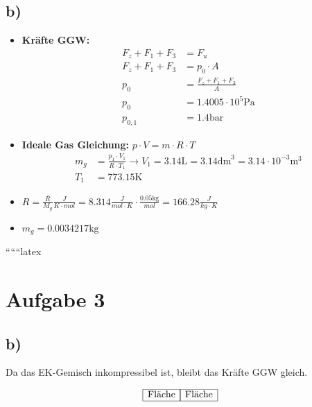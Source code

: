 \subsection*{b)}

\begin{itemize}
    \item \textbf{Kräfte GGW:}
    \begin{align*}
        F_z + F_1 + F_3 &= F_u \\
        F_z + F_1 + F_3 &= p_0 \cdot A \\
        p_0 &= \frac{F_z + F_1 + F_3}{A} \\
        p_0 &= 1.4005 \cdot 10^5 \text{Pa} \\
        p_{0,1} &= 1.4 \text{bar}
    \end{align*}
    \item \textbf{Ideale Gas Gleichung:} $p \cdot V = m \cdot R \cdot T$
    \begin{align*}
        m_g &= \frac{p_1 \cdot V_1}{R \cdot T_1} \rightarrow V_1 = 3.14 \text{L} = 3.14 \text{dm}^3 = 3.14 \cdot 10^{-3} \text{m}^3 \\
        T_1 &= 773.15 \text{K}
    \end{align*}
    \item $R = \frac{\bar{R}}{M_g} \frac{J}{K \cdot mol} = 8.314 \frac{J}{mol \cdot K} \cdot \frac{0.05 \text{kg}}{mol} = 166.28 \frac{J}{kg \cdot K}$
    \item $m_g = 0.0034217 \text{kg}$
\end{itemize}

``````latex


\section*{Aufgabe 3}

\subsection*{b)}

Da das EK-Gemisch inkompressibel ist, bleibt das Kräfte GGW gleich.

\[
\begin{array}{c}
\begin{array}{|c|}
\hline
\text{Fläche} \\
\hline
\end{array}
\begin{array}{|c|}
\hline
\text{Fläche} \\
\hline
\end{array}
\end{array}
\]

